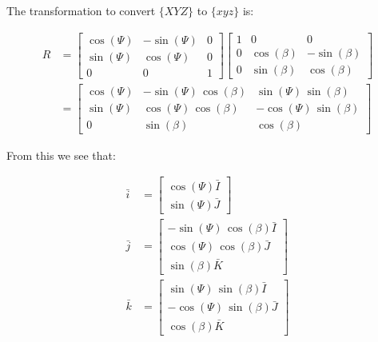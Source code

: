 \documentclass[12pt, letterpaper]{../assignment}
\begin{document}
The transformation to convert $\{XYZ\}$ to $\{xyz\}$ is:

\begin{equation*}
    \begin{aligned}
R &= \left[\begin{array}{ccc} \cos\left(\Psi \right) & -\sin\left(\Psi \right) & 0\\ \sin\left(\Psi \right) & \cos\left(\Psi \right) & 0\\ 0 & 0 & 1 \end{array}\right]
\left[\begin{array}{ccc} 1 & 0 & 0\\ 0 & \cos\left(\beta \right) & -\sin\left(\beta \right)\\ 0 & \sin\left(\beta \right) & \cos\left(\beta \right) \end{array}\right]\\
&= \left[\begin{array}{ccc} \cos\left(\Psi \right) & -\sin\left(\Psi \right)\,\cos\left(\beta \right) & \sin\left(\Psi \right)\,\sin\left(\beta \right)\\ \sin\left(\Psi \right) & \cos\left(\Psi \right)\,\cos\left(\beta \right) & -\cos\left(\Psi \right)\,\sin\left(\beta \right)\\ 0 & \sin\left(\beta \right) & \cos\left(\beta \right) \end{array}\right]
\end{aligned}
\end{equation*}

From this we see that:

\begin{equation*}
\begin{aligned}
    \bar{i} &= \left[\begin{array}{r} \cos\left(\Psi \right) \bar{I}\\ \sin\left(\Psi \right) \bar{J} \end{array}\right]\\
    \bar{j} &= \left[\begin{array}{r} -\sin\left(\Psi \right)\,\cos\left(\beta \right) \bar{I} \\ \cos\left(\Psi \right)\,\cos\left(\beta \right) \bar{J}\\ \sin\left(\beta \right) \bar{K} \end{array} \right] \\
    \bar{k} &= \left[\begin{array}{r} \sin\left(\Psi \right)\,\sin\left(\beta \right) \bar{I}\\ -\cos\left(\Psi \right)\,\sin\left(\beta \right) \bar{J}\\ \cos\left(\beta \right) \bar{K} \end{array} \right] \\
\end{aligned}
\end{equation*}
\end{document}
